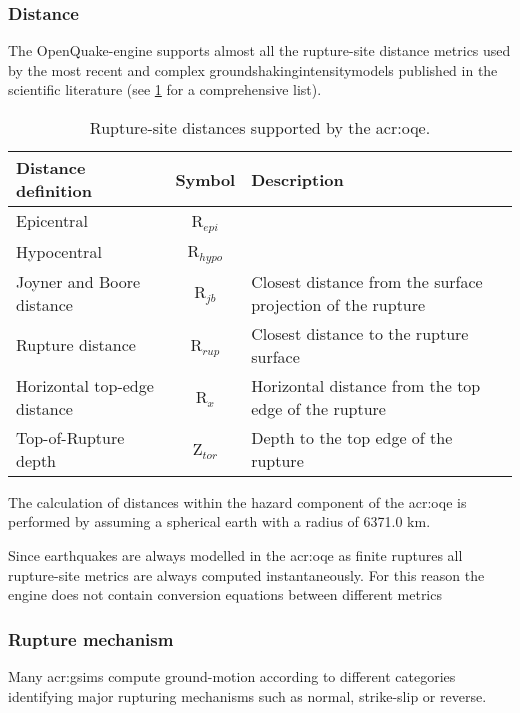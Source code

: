 \subsubsection{Distance}
%
The OpenQuake-engine supports almost all the rupture-site 
distance metrics used by the most recent and complex 
\glspl{groundshakingintensitymodel} published in the scientific 
literature (see \ref{tab:distances} for a comprehensive list).
\begin{table}[!b]
\centering
\begin{tabular}{|p{5cm}cp{5cm}|}
\hline
\rowcolor{anti-flashwhite}
\bf{Distance definition} & \bf{Symbol} & \bf{Description} \\
\hline 
Epicentral & R$_{epi}$ & \\
Hypocentral & R$_{hypo}$ & \\
Joyner and Boore distance & R$_{jb}$ & Closest distance from the surface 
    projection of the rupture \\
Rupture distance & R$_{rup}$ & Closest distance to the rupture surface \\
Horizontal top-edge distance & R$_{x}$ & Horizontal distance from the top 
    edge of the rupture \\
Top-of-Rupture depth & Z$_{tor}$ & Depth to the top edge of the rupture \\
\hline
\end{tabular}
\caption{Rupture-site distances supported by the \gls{acr:oqe}.}
\label{tab:distances}
\end{table}
The calculation of distances within the hazard component of the \gls{acr:oqe} 
is performed by assuming a spherical earth with a radius of 6371.0 km. 

Since earthquakes are always modelled in the \gls{acr:oqe} as finite ruptures 
all rupture-site metrics are always computed instantaneously. For this reason
the engine does not contain conversion equations between different metrics
\parencite[e.g.][]{scherbaum2004}
%
\subsubsection{Rupture mechanism}
Many \glspl{acr:gsim} compute ground-motion according to 
different categories identifying major rupturing mechanisms such as normal,
strike-slip or reverse.

